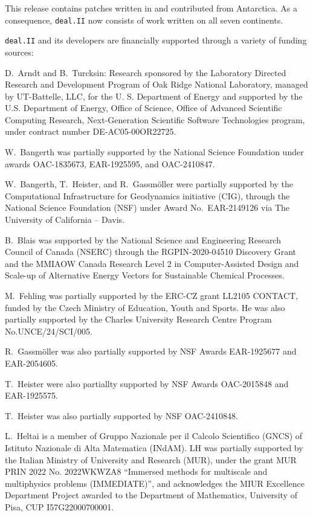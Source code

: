 \documentclass{ansarticle-preprint}
\newcommand{\specialword}[1]{\texttt{#1}}
\newcommand{\dealii}{{\specialword{deal.II}}\xspace}
\begin{document}
This release contains patches written in and contributed from
Antarctica. As a consequence, \dealii{} now consists of work written
on all seven continents.

\bigskip

\dealii and its developers are financially supported through a
variety of funding sources:

D.~Arndt and B.~Turcksin: Research sponsored by the Laboratory Directed Research and
Development Program of Oak Ridge National Laboratory, managed by UT-Battelle,
LLC, for the U. S. Department of Energy and supported by the U.S. Department of Energy,
Office of Science, Office of Advanced Scientific Computing Research,
Next-Generation Scientific Software Technologies program, under contract
number DE-AC05-00OR22725.

W.~Bangerth was partially supported by the National Science Foundation
under awards OAC-1835673, EAR-1925595, and OAC-2410847.

W.~Bangerth, T.~Heister, and R.~Gassm\"{o}ller were partially
supported by the Computational Infrastructure for Geodynamics initiative
(CIG), through the National Science Foundation (NSF) under Award
No.~EAR-2149126 via The University of California -- Davis.


B.~Blais was supported by the National Science and Engineering Research Council of Canada (NSERC)  through the RGPIN-2020-04510 Discovery Grant and the MMIAOW Canada Research Level 2 in Computer-Assisted Design and Scale-up of Alternative Energy Vectors for Sustainable Chemical Processes.

M.~Fehling was partially supported by the ERC-CZ grant LL2105 CONTACT,
funded by the Czech Ministry of Education, Youth and Sports. He was also
partially supported by the Charles University Research Centre Program No.\@ UNCE/24/SCI/005.

R.~Gassm\"{o}ller was also partially supported by NSF Awards EAR-1925677
and EAR-2054605.

T.~Heister were also partiallty supported by NSF Awards OAC-2015848 and EAR-1925575.

T.~Heister was also partially supported by NSF OAC-2410848.

L.~Heltai is a member of Gruppo Nazionale per il Calcolo Scientifico (GNCS) of
Istituto Nazionale di Alta Matematica (INdAM). LH was partially supported by
the Italian Ministry of University and Research (MUR), under the grant MUR PRIN
2022 No. 2022WKWZA8 ``Immersed methods for multiscale and multiphysics problems
(IMMEDIATE)'', and acknowledges the MIUR Excellence Department Project awarded
to the Department of Mathematics, University of Pisa, CUP I57G22000700001.
\end{document}
